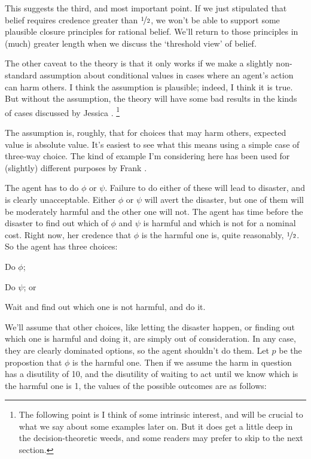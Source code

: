 This suggests the third, and most important point. If we just stipulated that belief requires credence greater than \(\nicefrac{1}{2}\), we won't be able to support some plausible closure principles for rational belief. We'll return to those principles in (much) greater length when we discuss the `threshold view' of belief.

The other caveat to the theory is that it only works if we make a slightly non-standard assumption about conditional values in cases where an agent's action can harm others. I think the assumption is plausible; indeed, I think it is true. But without the assumption, the theory will have some bad results in the kinds of cases discussed by Jessica \cite{Brown200x}. \footnote{The following point is I think of some intrinsic interest, and will be crucial to what we say about some examples later on. But it does get a little deep in the decision-theoretic weeds, and some readers may prefer to skip to the next section.}

The assumption is, roughly, that for choices that may harm others, expected value is absolute value. It's easiest to see what this means using a simple case of three-way choice. The kind of example I'm considering here has been used for (slightly) different purposes by Frank \cite{Jackson1991}. 

The agent has to do \(\phi\) or \(\psi\). Failure to do either of these will lead to disaster, and is clearly unacceptable. Either \(\phi\) or \(\psi\) will avert the disaster, but one of them will be moderately harmful and the other one will not. The agent has time before the disaster to find out which of \(\phi\) and \(\psi\) is harmful and which is not for a nominal cost. Right now, her credence that \(\phi\) is the harmful one is, quite reasonably, \(\nicefrac{1}{2}\). So the agent has three choices:

\begin{itemize*}
\item Do \(\phi\);
\item Do \(\psi\); or
\item Wait and find out which one is not harmful, and do it.
\end{itemize*}

\noindent We'll assume that other choices, like letting the disaster happen, or finding out which one is harmful and doing it, are simply out of consideration. In any case, they are clearly dominated options, so the agent shouldn't do them. Let \(p\) be the propostion that \(\phi\) is the harmful one. Then if we assume the harm in question has a disutility of 10, and the disutility of waiting to act until we know which is the harmful one is 1, the values of the possible outcomes are as follows:


